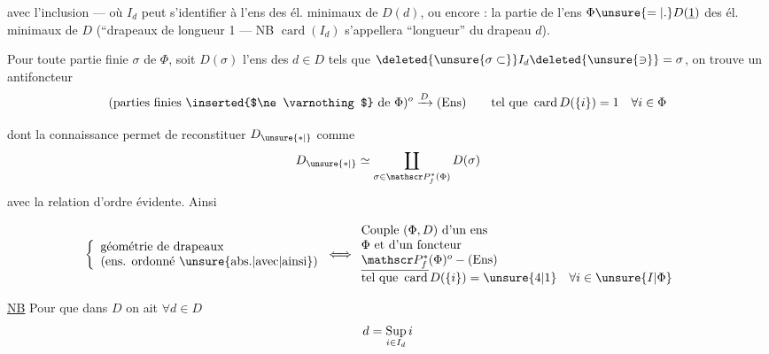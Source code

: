 

avec l'inclusion --- où $I_d$ peut s'identifier à l'ens des él. minimaux de $D(d)$, ou encore : la partie de l'ens $\Phi\unsure{=|.}D(\underline{1})$ des él. minimaux de $D$ (``drapeaux de longueur 1 --- NB $\operatorname{card}(I_d)$ s'appellera ``longueur'' du drapeau $d$).

Pour toute partie finie $\sigma$ de $\Phi$, soit $D(\sigma)$ l'ens des $d\in D$ tels que $\deleted{\unsure{\sigma\subset}}I_d\deleted{\unsure{\ni}}=\sigma$, on trouve un antifoncteur
\[
 (\text{parties finies \inserted{$\ne\varnothing$} de }\Phi)^o\xrightarrow{D}(\mathrm{Ens})\qquad
 \text{tel que }\operatorname{card}D(\{i\})=1\quad\forall i\in\Phi
\]

dont la connaissance permet de reconstituer $D_{\unsure{*|{}}}$ comme
\[
 D_{\unsure{*|{}}}\simeq\coprod_{\sigma\in\mathscr P_f^*(\Phi)}D(\sigma)
\]
avec la relation d'ordre évidente. Ainsi

\[
\begin{aligned}
\left\{\begin{array}{l}\text{géométrie de drapeaux}\\\text{(ens. ordonné \unsure{abs.|avec|ainsi})}\end{array}\right.
 &\Longleftrightarrow \begin{array}{l}
 \text{Couple }(\Phi,D)\text{ d'un ens}\\
 \Phi\text{ et d'un foncteur}\\
 \underline{\mathscr P_f^*}(\Phi)^o\mathbin{-}(\mathrm{Ens})\\
 \text{tel que }\operatorname{card}D(\{i\})=\unsure{4|1}\quad\forall i\in\unsure{I|\Phi}
 \end{array}
\end{aligned}
\]


\uline{NB} Pour que dans $D$ on ait $\forall d\in D$
\[
 d=\mathop{\rm Sup}_{i\in I_d}i
\]


